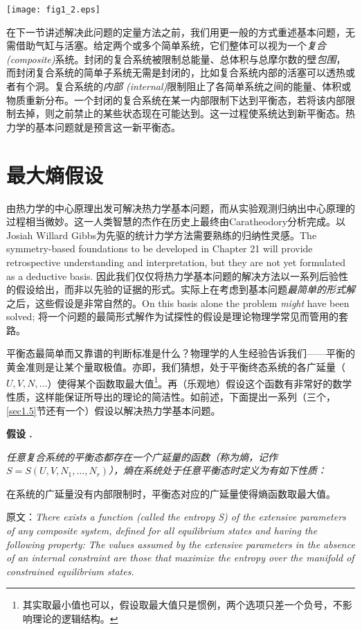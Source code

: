 {{
	\centering
	\texttt{[image: fig1\_2.eps]}
	\figcaption{}
}}

在下一节讲述解决此问题的定量方法之前，我们用更一般的方式重述基本问题，无需借助气缸与活塞。给定两个或多个简单系统，它们整体可以视为一个{\it 复合 (composite)}系统。封闭的复合系统被限制总能量、总体积与总摩尔数的壁{\it 包围}，而封闭复合系统的简单子系统无需是封闭的，比如复合系统内部的活塞可以透热或者有个洞。复合系统的{\it 内部 (internal)}限制阻止了各简单系统之间的能量、体积或物质重新分布。一个封闭的复合系统在某一内部限制下达到平衡态，若将该内部限制去掉，则之前禁止的某些状态现在可能达到。这一过程使系统达到新平衡态。热力学的基本问题就是预言这一新平衡态。

\section{最大熵假设}
\label{sec1.10}
由热力学的中心原理出发可解决热力学基本问题，而从实验观测归纳出中心原理的过程相当微妙。这一人类智慧的杰作在历史上最终由Caratheodory分析完成。以Josiah Willard Gibbs为先驱的统计力学方法需要熟练的归纳性灵感。The symmetry-based foundations to be developed in Chapter 21 will provide retrospective understanding and interpretation, but they are not yet formulated as a deductive basis. 
因此我们仅仅将热力学基本问题的解决方法以一系列后验性的假设给出，而非以先验的证据的形式。实际上在考虑到基本问题{\it 最简单的形式解}之后，这些假设是非常自然的。On this basis alone the problem {\it might} have been solved; 将一个问题的最简形式解作为试探性的假设是理论物理学常见而管用的套路。

平衡态最简单而又靠谱的判断标准是什么？物理学的人生经验告诉我们——平衡的黄金准则是让某个量取极值。亦即，我们猜想，处于平衡终态系统的各广延量（$U, V, N, \dots$）使得某个函数取最大值\footnote{其实取最小值也可以，假设取最大值只是惯例，两个选项只差一个负号，不影响理论的逻辑结构。}。再（乐观地）假设这个函数有非常好的数学性质，这样能保证所导出的理论的简洁性。如前述，下面提出一系列（三个，\ref{sec1.5}节还有一个）假设以解决热力学基本问题。

{\bf 假设 \uppercase\expandafter{}. } {\it 任意复合系统的平衡态都存在一个广延量的函数（称为熵，记作$S = S(U, V, N_1, \dots, N_r)$），熵在系统处于任意平衡态时定义为有如下性质：

在系统的广延量没有内部限制时，平衡态对应的广延量使得熵函数取最大值。}


{原文：{\it There exists a function (called the entropy S) of the extensive parameters of any composite system, defined for all equilibrium states and 
having the following property: The values assumed by the extensive parameters in the absence of an internal constraint are those that maximize the entropy over the manifold of constrained equilibrium states. }}

